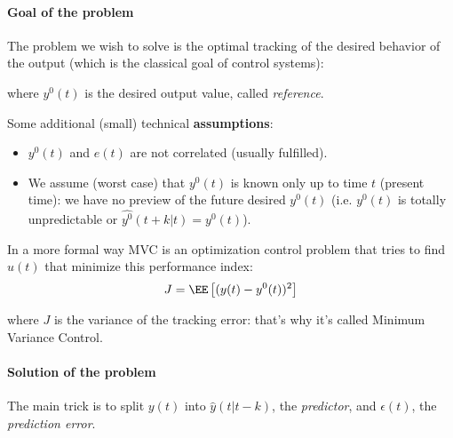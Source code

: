 \paragraph{Goal of the problem} 
The problem we wish to solve is the optimal tracking of the desired behavior of the output (which is the classical goal of control systems):
\begin{figure}[H]
    \centering
\end{figure}
where $y^0(t)$ is the desired output value, called \emph{reference}.

Some additional (small) technical \textbf{assumptions}:
\begin{itemize}
    \item $y^0(t)$ and $e(t)$ are not correlated (usually fulfilled).
    \item We assume (worst case) that $y^0(t)$ is known only up to time $t$ (present time): we have no preview of the future desired $y^0(t)$ (i.e. $y^0(t)$ is totally unpredictable or $\hat{y^0}(t+k|t) = y^0(t)$).
\end{itemize} 

In a more formal way MVC is an optimization control problem that tries to find $u(t)$ that minimize this performance index:
\[
    J = \EE \left[ (y(t) - y^0(t))^2 \right]
\]

where $J$ is the variance of the tracking error: that's why it's called Minimum Variance Control.

\paragraph{Solution of the problem}
The main trick is to split $y(t)$ into $\hat{y}(t|t-k)$, the \emph{predictor}, and $\epsilon(t)$, the \emph{prediction error}.

